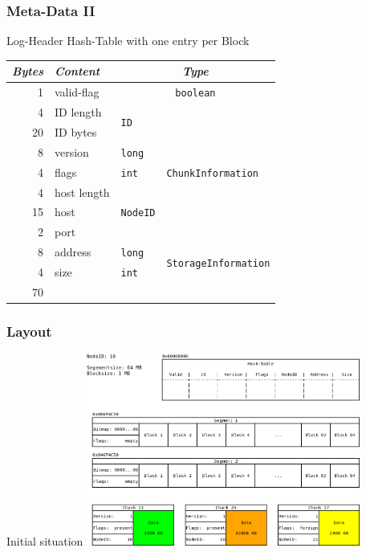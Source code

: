 \documentclass{beamer}
\begin{document}
	\begin{frame}
		\frametitle{Meta-Data II}

		\begin{block}{Log-Header}
			Hash-Table with one entry per Block
			\begin{tabular}{|r|l|l|l|}
				\hline
				\emph{Bytes}	&\emph{Content}	&\multicolumn{2}{|c|}{\emph{Type}}							\\\hline
				1		&valid-flag	&\multicolumn{2}{|c|}{\texttt{boolean}}							\\\hline
				4		&ID length	&\multirow{2}{*}{\texttt{ID}}		&\multirow{7}{*}{\texttt{ChunkInformation}}	\\\cline{1-2}
				20		&ID bytes	&					&						\\\cline{1-3}
				8		&version	&\texttt{long}				&						\\\cline{1-3}
				4		&flags		&\texttt{int}				&						\\\cline{1-3}
				4		&host length	&\multirow{3}{*}{\texttt{NodeID}}	&						\\\cline{1-2}
				15		&host		&					&						\\\cline{1-2}
				2		&port		&					&						\\\hline
				8		&address	&\texttt{long}				&\multirow{2}{*}{\texttt{StorageInformation}}	\\\cline{1-3}
				4		&size		&\texttt{int}				&						\\\hline\cline{1-1}
				70		&\multicolumn{3}{c}{}											\\\cline{1-1}
			\end{tabular}
		\end{block}
	\end{frame}

	\begin{frame}
		\frametitle{Layout}

		\begin{block}{Initial situation}
			\center\includegraphics[width=9cm]{./img/Log_Layout_00}
		\end{block}
	\end{frame}
\end{document}
